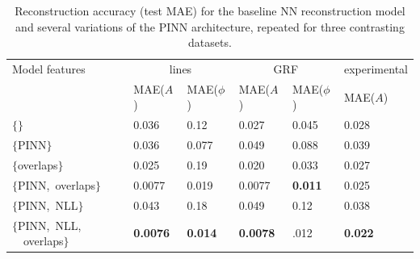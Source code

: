 \documentclass[sn-mathphys]{sn-jnl}%
\theoremstyle{thmstyleone}%
\theoremstyle{thmstyletwo}%
\theoremstyle{thmstylethree}%
\begin{document}
\begin{table}[h]
\begin{center}
\caption{Reconstruction accuracy (test MAE) for the baseline NN reconstruction model and several variations of the PINN architecture, repeated for three contrasting datasets. }\label{tab1}%
\begin{tabular}{p{2cm}llllll}
\toprule 
    Model features & \multicolumn{2}{c}{lines} & \multicolumn{2}{c}{GRF} & \multicolumn{2}{c}{experimental}\\

    & MAE($A$) & MAE($\phi$)
    & MAE($A$) & MAE($\phi$)
    & MAE($A$) \\%
    \midrule
$\{\}$ \footnotemark[1]    & 0.036   & 0.12  & 0.027 & 0.045 & 0.028 \\
$\{\mathrm{PINN}  \}$  & 0.036   & 0.077 & 0.049 & 0.088 & 0.039 \\
$\{$overlaps$\}$  & 0.025 & 0.19 &  0.020 & 0.033 & 0.027 \\
$\{$PINN,~overlaps$\}$   & 0.0077 & 0.019 & 0.0077 & \bf{0.011} & 0.025 \\
  $\{$PINN,~NLL$\}$     & 0.043    &   0.18  & 0.049 & 0.12 &  0.038 \\
  $\{$PINN,~NLL,\newline
 ~~overlaps$\}$     & \bf{0.0076}    &   \bf{0.014}  & \bf{0.0078} & .012 &  \bf{0.022}  \\
    \bottomrule
\end{tabular}
\end{center}
\end{table}

\end{document}
